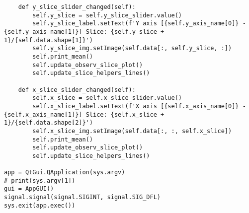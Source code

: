 \documentclass[../main.tex]{subfiles}
\begin{document}
\begin{lstlisting}
    def y_slice_slider_changed(self):
        self.y_slice = self.y_slice_slider.value()
        self.y_slice_label.setText(f'Y axis [{self.y_axis_name[0]} - {self.y_axis_name[1]}] Slice: {self.y_slice + 1}/{self.data.shape[1]}')
        self.y_slice_img.setImage(self.data[:, self.y_slice, :])
        self.print_mean()
        self.update_observ_slice_plot()
        self.update_slice_helpers_lines()

    def x_slice_slider_changed(self):
        self.x_slice = self.x_slice_slider.value()
        self.x_slice_label.setText(f'X axis [{self.x_axis_name[0]} - {self.x_axis_name[1]}] Slice: {self.x_slice + 1}/{self.data.shape[2]}')
        self.x_slice_img.setImage(self.data[:, :, self.x_slice])
        self.print_mean()
        self.update_observ_slice_plot()
        self.update_slice_helpers_lines()

app = QtGui.QApplication(sys.argv)
# print(sys.argv[1])
gui = AppGUI()
signal.signal(signal.SIGINT, signal.SIG_DFL)
sys.exit(app.exec())


\end{lstlisting}

\newpage
\end{document}
